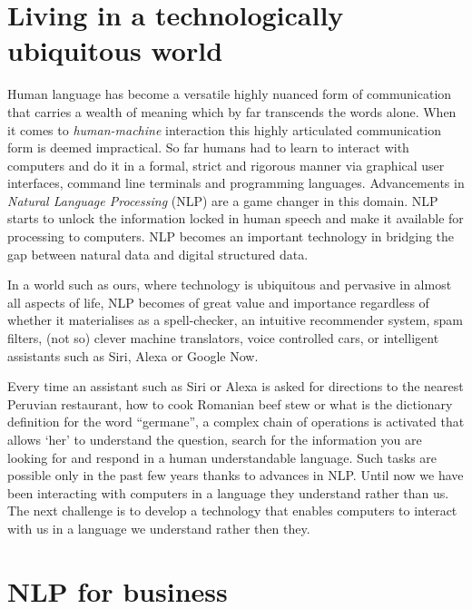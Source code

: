 \section{Living in a technologically ubiquitous world}
\label{sec:motivation}
Human language has become a versatile highly nuanced form of communication that carries a wealth of meaning which by far transcends the words alone. When it comes to \textit{human-machine} interaction this highly articulated communication form is deemed impractical. So far humans had to learn to interact with computers and do it in a formal, strict and rigorous manner via graphical user interfaces, command line terminals and programming languages. Advancements in \textit{Natural Language Processing} (NLP) are a game changer in this domain. NLP starts to unlock the information locked in human speech and make it available for processing to computers. NLP becomes an important technology in bridging the gap between natural data and digital structured data.

In a world such as ours, where technology is ubiquitous and pervasive in almost all aspects of life, NLP becomes of great value and importance regardless of whether it materialises as a spell-checker, an intuitive recommender system, spam filters, (not so) clever machine translators, voice controlled cars, or intelligent assistants such as Siri, Alexa or Google Now. 

Every time an assistant such as Siri or Alexa is asked for directions to the nearest Peruvian restaurant, how to cook Romanian beef stew or what is the dictionary definition for the word ``germane'', a complex chain of operations is activated that allows `her' to understand the question, search for the information you are looking for and respond in a human understandable language. Such tasks are possible only in the past few years thanks to advances in NLP. Until now we have been interacting with computers in a language they understand rather than us. The next challenge is to develop a technology that enables computers to interact with us in a language we understand rather then they. %

\section{NLP for business}
\label{sec:motivation-business}

